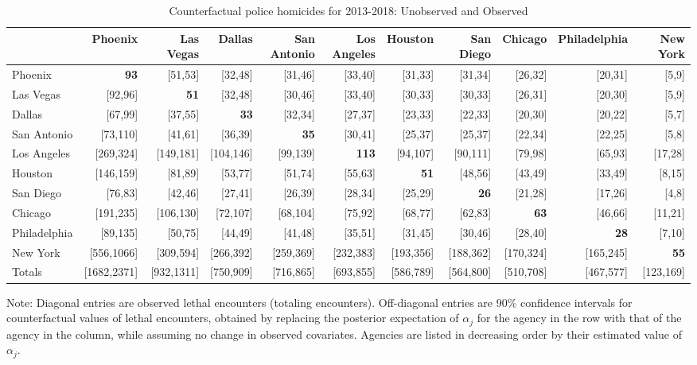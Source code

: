\begin{table}[h!]\centering\scriptsize\tabcolsep=0.1cm\caption{Counterfactual police homicides for 2013-2018: Unobserved and Observed} \label{table:bootstrap_counterfactual_unobs_obs}\begin{tabular}{lrrrrrrrrrr}\hline \hline&Phoenix&Las Vegas&Dallas&San Antonio&Los Angeles&Houston&San Diego&Chicago&Philadelphia&New York\\
\hline
Phoenix&\textbf{93}&[51,53]&[32,48]&[31,46]&[33,40]&[31,33]&[31,34]&[26,32]&[20,31]&[5,9]\\
Las Vegas&[92,96]&\textbf{51}&[32,48]&[30,46]&[33,40]&[30,33]&[30,33]&[26,31]&[20,30]&[5,9]\\
Dallas&[67,99]&[37,55]&\textbf{33}&[32,34]&[27,37]&[23,33]&[22,33]&[20,30]&[20,22]&[5,7]\\
San Antonio&[73,110]&[41,61]&[36,39]&\textbf{35}&[30,41]&[25,37]&[25,37]&[22,34]&[22,25]&[5,8]\\
Los Angeles&[269,324]&[149,181]&[104,146]&[99,139]&\textbf{113}&[94,107]&[90,111]&[79,98]&[65,93]&[17,28]\\
Houston&[146,159]&[81,89]&[53,77]&[51,74]&[55,63]&\textbf{51}&[48,56]&[43,49]&[33,49]&[8,15]\\
San Diego&[76,83]&[42,46]&[27,41]&[26,39]&[28,34]&[25,29]&\textbf{26}&[21,28]&[17,26]&[4,8]\\
Chicago&[191,235]&[106,130]&[72,107]&[68,104]&[75,92]&[68,77]&[62,83]&\textbf{63}&[46,66]&[11,21]\\
Philadelphia&[89,135]&[50,75]&[44,49]&[41,48]&[35,51]&[31,45]&[30,46]&[28,40]&\textbf{28}&[7,10]\\
New York&[556,1066]&[309,594]&[266,392]&[259,369]&[232,383]&[193,356]&[188,362]&[170,324]&[165,245]&\textbf{55}\\
\hline
Totals&[1682,2371]&[932,1311]&[750,909]&[716,865]&[693,855]&[586,789]&[564,800]&[510,708]&[467,577]&[123,169]\\
\hline\end{tabular}\begin{center}\begin{minipage}{1.05\textwidth} %
 {\footnotesize {\schape Note}: Diagonal entries are observed lethal encounters (totaling \totalincidentsten{} encounters). Off-diagonal entries are 90\% confidence intervals for counterfactual values of lethal encounters, obtained by replacing the posterior expectation of $\alpha_j$ for the agency in the row with that of the agency in the column, while assuming no change in observed covariates. Agencies are listed in decreasing order by their estimated value of $\alpha_j$.} 
 \end{minipage} 
 \end{center} 
 \end{table} 

